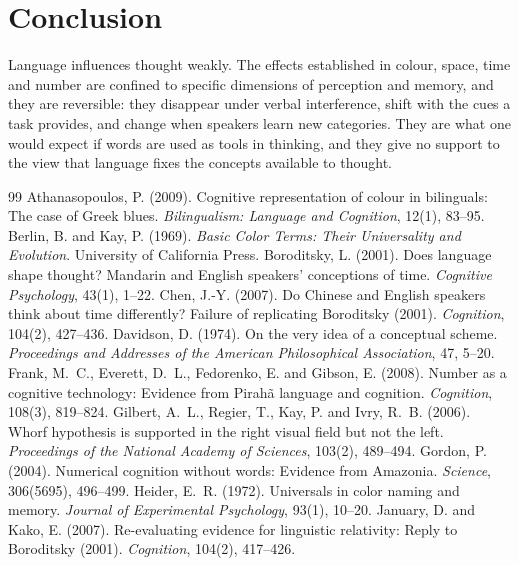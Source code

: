 \documentclass{situationist-preprint}
\begin{document}
\section{Conclusion}

Language influences thought weakly. The effects established in colour, space, time and number are confined to specific dimensions of perception and memory, and they are reversible: they disappear under verbal interference, shift with the cues a task provides, and change when speakers learn new categories. They are what one would expect if words are used as tools in thinking, and they give no support to the view that language fixes the concepts available to thought.

\begin{thebibliography}{99}\small
{} Athanasopoulos, P. (2009). Cognitive representation of colour in bilinguals: The case of Greek blues. \emph{Bilingualism: Language and Cognition}, 12(1), 83--95.
 Berlin, B. and Kay, P. (1969). \emph{Basic Color Terms: Their Universality and Evolution}. University of California Press.
 Boroditsky, L. (2001). Does language shape thought? Mandarin and English speakers' conceptions of time. \emph{Cognitive Psychology}, 43(1), 1--22.
 Chen, J.-Y. (2007). Do Chinese and English speakers think about time differently? Failure of replicating Boroditsky (2001). \emph{Cognition}, 104(2), 427--436.
 Davidson, D. (1974). On the very idea of a conceptual scheme. \emph{Proceedings and Addresses of the American Philosophical Association}, 47, 5--20.
 Frank, M.~C., Everett, D.~L., Fedorenko, E. and Gibson, E. (2008). Number as a cognitive technology: Evidence from Pirah\~a language and cognition. \emph{Cognition}, 108(3), 819--824.
 Gilbert, A.~L., Regier, T., Kay, P. and Ivry, R.~B. (2006). Whorf hypothesis is supported in the right visual field but not the left. \emph{Proceedings of the National Academy of Sciences}, 103(2), 489--494.
 Gordon, P. (2004). Numerical cognition without words: Evidence from Amazonia. \emph{Science}, 306(5695), 496--499.
 Heider, E.~R. (1972). Universals in color naming and memory. \emph{Journal of Experimental Psychology}, 93(1), 10--20.
 January, D. and Kako, E. (2007). Re-evaluating evidence for linguistic relativity: Reply to Boroditsky (2001). \emph{Cognition}, 104(2), 417--426.

\end{thebibliography}
\end{document}
